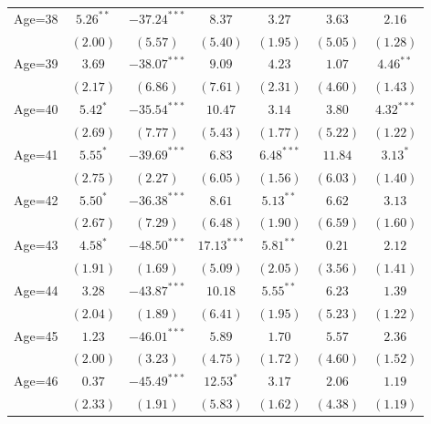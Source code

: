 \documentclass[fullpage]{paper}
\begin{document}
\begin{center}
\begin{longtable}{l c c c c c c }
Age=38      & $5.26^{**}$  & $-37.24^{***}$ & $8.37$        & $3.27$       & $3.63$        & $2.16$        \\
            & $(2.00)$     & $(5.57)$       & $(5.40)$      & $(1.95)$     & $(5.05)$      & $(1.28)$      \\
Age=39      & $3.69$       & $-38.07^{***}$ & $9.09$        & $4.23$       & $1.07$        & $4.46^{**}$   \\
            & $(2.17)$     & $(6.86)$       & $(7.61)$      & $(2.31)$     & $(4.60)$      & $(1.43)$      \\
Age=40      & $5.42^{*}$   & $-35.54^{***}$ & $10.47$       & $3.14$       & $3.80$        & $4.32^{***}$  \\
            & $(2.69)$     & $(7.77)$       & $(5.43)$      & $(1.77)$     & $(5.22)$      & $(1.22)$      \\
Age=41      & $5.55^{*}$   & $-39.69^{***}$ & $6.83$        & $6.48^{***}$ & $11.84$       & $3.13^{*}$    \\
            & $(2.75)$     & $(2.27)$       & $(6.05)$      & $(1.56)$     & $(6.03)$      & $(1.40)$      \\
Age=42      & $5.50^{*}$   & $-36.38^{***}$ & $8.61$        & $5.13^{**}$  & $6.62$        & $3.13$        \\
            & $(2.67)$     & $(7.29)$       & $(6.48)$      & $(1.90)$     & $(6.59)$      & $(1.60)$      \\
Age=43      & $4.58^{*}$   & $-48.50^{***}$ & $17.13^{***}$ & $5.81^{**}$  & $0.21$        & $2.12$        \\
            & $(1.91)$     & $(1.69)$       & $(5.09)$      & $(2.05)$     & $(3.56)$      & $(1.41)$      \\
Age=44      & $3.28$       & $-43.87^{***}$ & $10.18$       & $5.55^{**}$  & $6.23$        & $1.39$        \\
            & $(2.04)$     & $(1.89)$       & $(6.41)$      & $(1.95)$     & $(5.23)$      & $(1.22)$      \\
Age=45      & $1.23$       & $-46.01^{***}$ & $5.89$        & $1.70$       & $5.57$        & $2.36$        \\
            & $(2.00)$     & $(3.23)$       & $(4.75)$      & $(1.72)$     & $(4.60)$      & $(1.52)$      \\
Age=46      & $0.37$       & $-45.49^{***}$ & $12.53^{*}$   & $3.17$       & $2.06$        & $1.19$        \\
            & $(2.33)$     & $(1.91)$       & $(5.83)$      & $(1.62)$     & $(4.38)$      & $(1.19)$      \\

\end{longtable}
\end{center}
\end{document}
